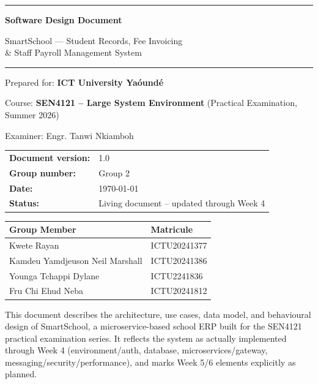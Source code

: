 \documentclass[11pt,a4paper]{report}
\newcommand{\sysname}{SmartSchool}
\begin{document}
\begin{titlepage}
\begin{center}
\vspace*{1.2cm}

{\color{primary}\rule{\linewidth}{2pt}}

\vspace{0.8cm}
{\Huge\bfseries\color{primary} Software Design Document}

\vspace{0.4cm}
{\LARGE\color{primarydark} \sysname{} --- Student Records, Fee Invoicing\\[2pt] \& Staff Payroll Management System}

\vspace{0.6cm}
{\color{primary}\rule{\linewidth}{2pt}}

\vspace{2cm}

{\Large Prepared for: \textbf{ICT University Ya\'ound\'e}}

\vspace{0.3cm}
{\large Course: \textbf{SEN4121 -- Large System Environment} \quad (Practical Examination, Summer 2026)}

\vspace{0.3cm}
{\large Examiner: Engr. Tanwi Nkiamboh}

\vspace{1.5cm}

\begin{tabular}{ll}
\textbf{Document version:} & 1.0 \\[4pt]
\textbf{Group number:} & Group 2 \\[4pt]
\textbf{Date:} & \today \\[4pt]
\textbf{Status:} & Living document -- updated through Week 4 \\
\end{tabular}

\vspace{1cm}

\begin{tabular}{@{}p{6cm}p{4.5cm}@{}}
\toprule
\textbf{Group Member} & \textbf{Matricule} \\
\midrule
Kwete Rayan & ICTU20241377 \\
Kamdeu Yamdjeuson Neil Marshall & ICTU20241386 \\
Younga Tchappi Dylane & ICTU2241836 \\
Fru Chi Ehud Neba & ICTU20241812 \\
\bottomrule
\end{tabular}

\vfill

{\small\color{bodytext} This document describes the architecture, use cases,
data model, and behavioural design of \sysname{}, a microservice-based
school ERP built for the SEN4121 practical examination series. It reflects
the system as actually implemented through Week 4 (environment/auth,
database, microservices/gateway, messaging/security/performance), and marks
Week 5/6 elements explicitly as planned.}

\end{center}
\end{titlepage}
\end{document}
